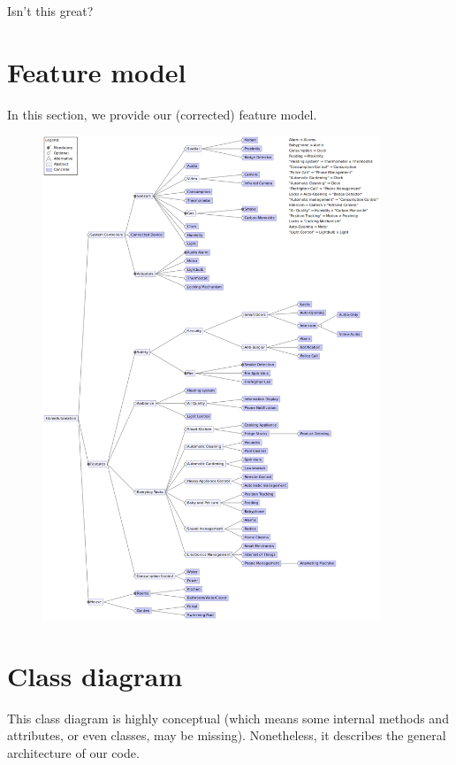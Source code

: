 			Isn't this great?

	\section{Feature model}
		In this section, we provide our (corrected) feature model.	
	
        \begin{figure}[H]
            \includegraphics[width=0.9\textwidth]{FeatureModel_3.png}
        \end{figure}

	\section{Class diagram}
		This class diagram is highly conceptual (which means some internal methods and attributes, or even classes, may be missing). Nonetheless, it describes the general architecture of our code.

